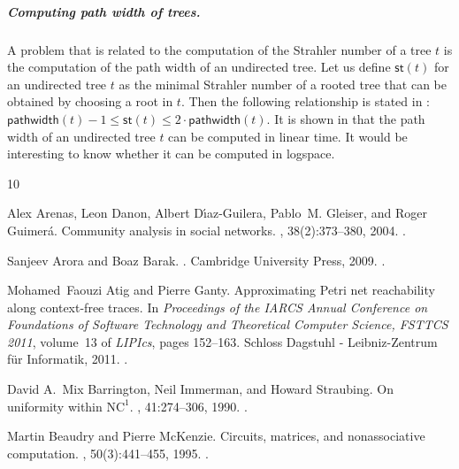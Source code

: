 \documentclass[a4paper,UKenglish,cleveref, autoref, thm-restate, numberwithinsect]{lipics-v2021}
\newcommand{\hs}{\mathsf{st}}
\begin{document}
\subparagraph{Computing path width of trees.}
A problem that is related to the computation of the Strahler number of a tree $t$ is the computation of the path width of an undirected
tree. Let us define $\hs(t)$ for an undirected tree $t$ as the minimal Strahler number of a rooted tree that can be obtained
by choosing a root in $t$. Then the following relationship is stated in \cite{EsparzaLS14}:
$\mathsf{pathwidth}(t)-1 \le \hs(t) \le 2\cdot\mathsf{pathwidth}(t)$.
It is shown in \cite{Scheffler1990} that the path width of an undirected tree $t$ can be computed in linear time. It would 
be interesting to know whether it can be computed in logspace.


\def\cprime{$'$} \def\cprime{$'$}
\begin{thebibliography}{10}

Alex {Arenas}, Leon {Danon}, Albert {D{\'\i}az-Guilera}, Pablo~M. {Gleiser},
  and Roger {Guimer{\'a}}.
\newblock Community analysis in social networks.
, 38(2):373--380, 2004.
\newblock \href {https://doi.org/10.1140/epjb/e2004-00130-1}
  {}.

Sanjeev Arora and Boaz Barak.
.
\newblock Cambridge University Press, 2009.
\newblock \href {https://doi.org/10.1017/CBO9780511804090}
  {}.

Mohamed~Faouzi Atig and Pierre Ganty.
\newblock Approximating {Petri} net reachability along context-free traces.
\newblock In {\em Proceedings of the {IARCS} Annual Conference on Foundations
  of Software Technology and Theoretical Computer Science, {FSTTCS} 2011},
  volume~13 of {\em LIPIcs}, pages 152--163. Schloss Dagstuhl - Leibniz-Zentrum
  f{\"{u}}r Informatik, 2011.
\newblock \href {https://doi.org/10.4230/LIPICS.FSTTCS.2011.152}
  {}.

David A.~Mix Barrington, Neil Immerman, and Howard Straubing.
\newblock On uniformity within $\text{NC}^1$.
, 41:274--306, 1990.
\newblock \href {https://doi.org/10.1016/0022-0000(90)90022-D}
  {}.

Martin Beaudry and Pierre McKenzie.
\newblock Circuits, matrices, and nonassociative computation.
, 50(3):441--455, 1995.
\newblock \href {https://doi.org/10.1006/JCSS.1995.1035}
  {}.


\end{thebibliography}
\end{document}
